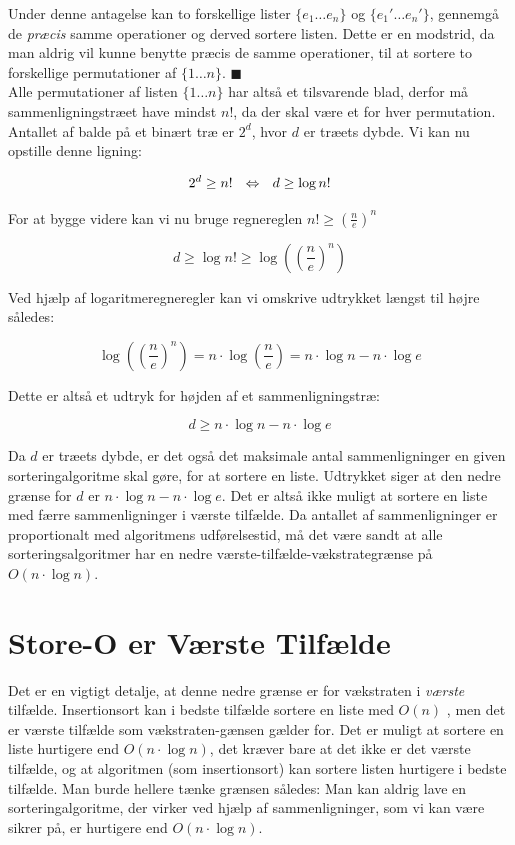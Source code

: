 Under denne antagelse kan to forskellige lister $\{e_1 \dots e_n\}$ og $\{e_1' \dots e_n'\}$, gennemgå de \emph{præcis} samme operationer og derved sortere listen. Dette er en modstrid, da man aldrig vil kunne benytte præcis de samme operationer, til at sortere to forskellige permutationer af $\{1 \dots n\}$. $\blacksquare$ \\


Alle permutationer af listen $\{1 \dots n\}$ har altså et tilsvarende blad, derfor må sammenligningstræet have mindst $n!$, da der skal være et for hver permutation.\\

Antallet af balde på et binært træ er $2^d$, hvor $d$ er træets dybde. Vi kan nu opstille denne ligning:


$$2^d \geq n! \:\:\:\Leftrightarrow\:\:\: d \geq \log n!$$

For at bygge videre kan vi nu bruge regnereglen $n! \geq \left( \frac{n}{e} \right)^n$

$$d \geq \log n! \geq \log \left(\left(\frac{n}{e}\right)^n\right)$$

Ved hjælp af logaritmeregneregler kan vi omskrive udtrykket længst til højre således:

$$\log \left(\left(\frac{n}{e}\right)^n\right) = n \cdot \log \left(\frac{n}{e} \right) = n \cdot \log n - n \cdot \log e$$

Dette er altså et udtryk for højden af et sammenligningstræ:

$$d \geq n \cdot \log n - n \cdot \log e$$

Da $d$ er træets dybde, er det også det maksimale antal sammenligninger en given sorteringalgoritme skal gøre, for at sortere en liste. Udtrykket siger at den nedre grænse for $d$ er $n \cdot \log n - n \cdot \log e$. Det er altså ikke muligt at sortere en liste med færre sammenligninger i værste tilfælde. Da antallet af sammenligninger er proportionalt med algoritmens udførelsestid, må det være sandt at alle sorteringsalgoritmer har en nedre værste-tilfælde-vækstrategrænse på $O(n \cdot \log n)$.


\section{Store-O er Værste Tilfælde}
\label{sec:Store-O er Værste Tilfælde}

Det er en vigtigt detalje, at denne nedre grænse er for vækstraten i \emph{værste} tilfælde. Insertionsort kan i bedste tilfælde sortere en liste med $O(n)$ \cite{big-o-cheatsheet}, men det er værste tilfælde som vækstraten-gænsen gælder for. Det er muligt at sortere en liste hurtigere end $O(n \cdot \log n)$, det kræver bare at det ikke er det værste tilfælde, og at algoritmen (som insertionsort) kan sortere listen hurtigere i bedste tilfælde. Man burde hellere tænke grænsen således: Man kan aldrig lave en sorteringalgoritme, der virker ved hjælp af sammenligninger, som vi kan være sikrer på, er hurtigere end $O(n \cdot \log n)$.

